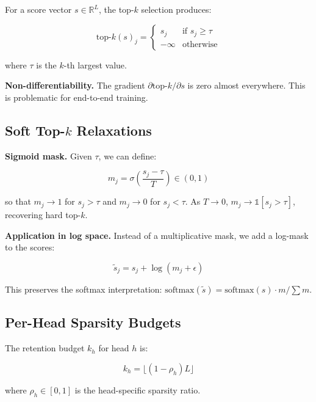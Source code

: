 For a score vector $s \in \mathbb{R}^L$, the top-$k$ selection produces:

\begin{equation}
\text{top-}k(s)_j = \begin{cases} s_j & \text{if } s_j \geq \tau \\ -\infty & \text{otherwise} \end{cases}
\end{equation}

where $\tau$ is the $k$-th largest value.

\textbf{Non-differentiability.} The gradient $\partial \text{top-}k / \partial s$ 
is zero almost everywhere. This is problematic for end-to-end training.

\subsection{Soft Top-$k$ Relaxations}

\textbf{Sigmoid mask.} Given $\tau$, we can define:

\begin{equation}
m_j = \sigma\!\left(\frac{s_j - \tau}{T}\right) \in (0, 1)
\end{equation}

so that $m_j \to 1$ for $s_j > \tau$ and $m_j \to 0$ for $s_j < \tau$. 
As $T \to 0$, $m_j \to \mathbb{1}[s_j > \tau]$, recovering hard top-$k$.

\textbf{Application in log space.} Instead of a multiplicative mask, we add a 
log-mask to the scores:

\begin{equation}
\tilde{s}_j = s_j + \log(m_j + \epsilon)
\end{equation}

This preserves the softmax interpretation: $\text{softmax}(\tilde{s}) = 
\text{softmax}(s) \cdot m / \sum m$.

\subsection{Per-Head Sparsity Budgets}

The retention budget $k_h$ for head $h$ is:

\begin{equation}
k_h = \lfloor (1 - \rho_h) L \rfloor
\end{equation}

where $\rho_h \in [0, 1]$ is the head-specific sparsity ratio.

